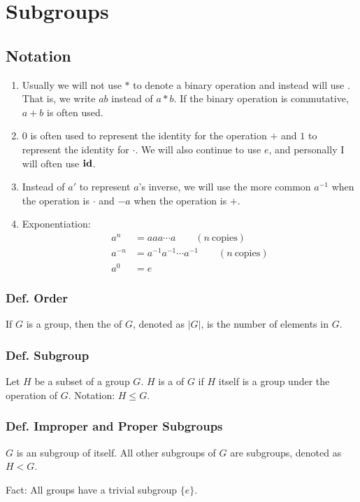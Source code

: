 \section{Subgroups}

\subsection{Notation}

\begin{enumerate}
    \item Usually we will not use $*$ to denote a binary operation and instead will use . That is, we write $ab$ instead of $a*b$. If the binary operation is commutative, $a+b$ is often used.
    \item $0$ is often used to represent the identity for the operation $+$ and $1$ to represent the identity for $\cdot$. We will also continue to use $e$, and personally I will often use $\operatorname{\textbf{id}}$.
    \item Instead of $a'$ to represent $a$'s inverse, we will use the more common $a^{-1}$ when the operation is $\cdot$ and $-a$ when the operation is $+$.
    \item Exponentiation:
    \begin{align*}
        a^n & = aaa\cdots a \qquad (n~\text{copies}) \\
        a^{-n} & = a^{-1}a^{-1}\cdots a^{-1} \qquad (n~\text{copies}) \\
        a^0 & = e
    \end{align*}
\end{enumerate}

\subsubsection{Def. Order}
If $G$ is a group, then the  of $G$, denoted as $|G|$, is the number of elements in $G$.

\subsubsection{Def. Subgroup}
Let $H$ be a subset of a group $G$. $H$ is a  of $G$ if $H$ itself is a group under the operation of $G$. Notation: $H \leq G$.

\subsubsection{Def. Improper and Proper Subgroups}
$G$ is an  subgroup of itself. All other subgroups of $G$ are  subgroups, denoted as $H < G$.

Fact: All groups have a trivial subgroup $\{e\}$.
